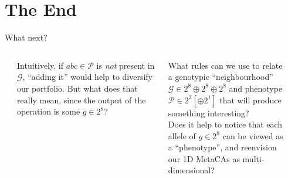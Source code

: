 \part{The End}
\frame{\partpage}

\begin{frame}[fragile]{What next?}{}
\begin{columns}[]
\begin{column}[T]{.1cm}
\end{column}
\begin{column}[T]{5.5cm}
\vspace*{.2cm}

{\small Intuitively, if $abc\in\mathcal{P}$ is \emph{not} present in $\mathcal{G}$,
  ``adding it'' would help to diversify our
portfolio.  But what does that really mean, since the
output of the operation is some $g\in2^8$?}
\end{column}
\begin{column}[T]{5.3cm}
\vspace{-.05in}
What rules can we use to relate a genotypic ``neighbourhood'' $\mathcal{G}\in 2^8\oplus2^8\oplus2^8$
and phenotype $\mathcal{P}\in 2^3 [\oplus2^1]$ that will produce
something interesting? \\[.3cm]
\vspace{.1in}
{\small Does it help to notice that each allele of $g\in2^8$ can be viewed as
a ``phenotype'', and reenvision our 1D MetaCAs as multi-dimensional?}
\end{column}
\begin{column}[T]{.1cm}
\end{column}
\end{columns}
\end{frame}
